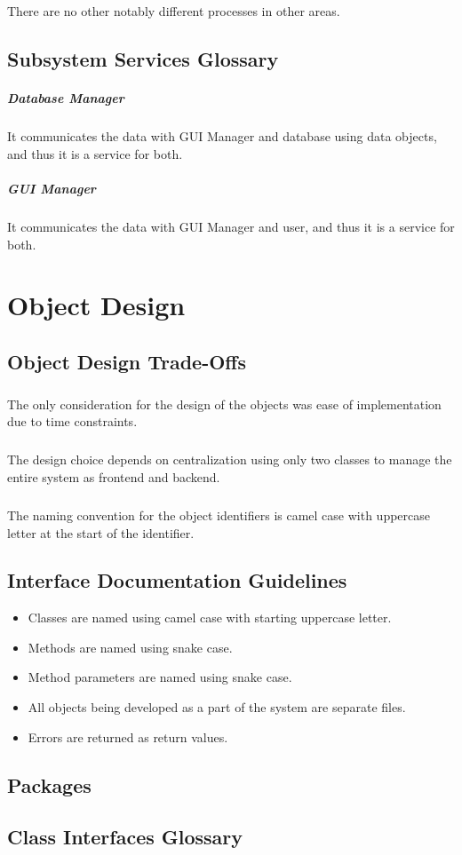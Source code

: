 \documentclass[a4paper,12pt]{report}
\begin{document}
			\paragraph{} There are no other notably different processes in other areas. 
		\section{Subsystem Services Glossary}
			\paragraph{Database Manager} It communicates the data with GUI Manager and database using data objects, and thus it is a service for both.
			\paragraph{GUI Manager} It communicates the data with GUI Manager and user, and thus it is a service for both.
	\chapter{Object Design}
		\section{Object Design Trade-Offs}
			\paragraph{} The only consideration for the design of the objects was ease of implementation due to time constraints.
			\paragraph{} The design choice depends on centralization using only two classes to manage the entire system as frontend and backend.
			\paragraph{} The naming convention for the object identifiers is camel case with uppercase letter at the start of the identifier.
		\section{Interface Documentation Guidelines}
			\begin{itemize}
				\item Classes are named using camel case with starting uppercase letter.
				\item Methods are named using snake case.
				\item Method parameters are named using snake case.
				\item All objects being developed as a part of the system are separate files.
				\item Errors are returned as return values.
			\end{itemize}
		\section{Packages}
		\section{Class Interfaces Glossary}
\end{document}
